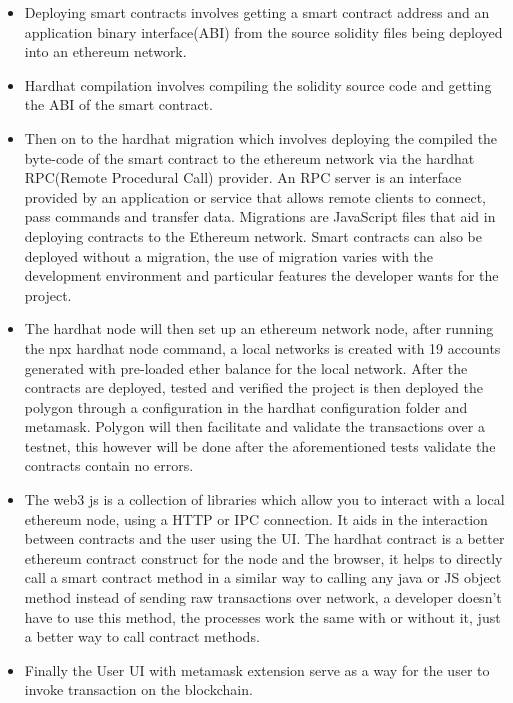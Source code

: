 \documentclass[a4paper,12pt]{article}
\begin{document}
\begin{itemize}
    \item Deploying smart contracts involves getting a smart contract address and an application binary interface(ABI) from the source solidity files being deployed into an ethereum network.
    \item Hardhat compilation involves compiling the solidity source code and getting the ABI of the smart contract.
    \item Then on to the hardhat migration which involves deploying the compiled the byte-code of the smart contract to the ethereum network via the hardhat RPC(Remote Procedural Call) provider. An RPC server is an interface provided by an application or service that allows remote clients to connect, pass commands and transfer data. Migrations are JavaScript files that aid in deploying contracts to the Ethereum network. Smart contracts can also be deployed without a migration, the use of migration varies with the development environment and particular features the developer wants for the project.
    \item The hardhat node will then set up an ethereum network node, after running the npx hardhat node command, a local networks is created with 19 accounts generated with pre-loaded ether balance for the local network. After the contracts are deployed, tested and verified the project is then deployed the polygon through a configuration in the hardhat configuration folder and metamask. Polygon will then facilitate and validate the transactions over a testnet, this however will be done after the aforementioned tests validate the contracts contain no errors.
    \item The web3 js is a collection of libraries which allow you to interact with a local ethereum node, using a HTTP or IPC connection. It aids in the interaction between contracts and the user using the UI. The hardhat contract is a better ethereum contract construct for the node and the browser, it helps to directly call a smart contract method in a similar way to calling any java or JS object method instead of sending raw transactions over network, a developer doesn't have to use this method, the processes work the same with or without it, just a better way to call contract methods.
    \item Finally the User UI with metamask extension serve as a way for the user to invoke transaction on the blockchain.
\end{itemize}
\end{document}
